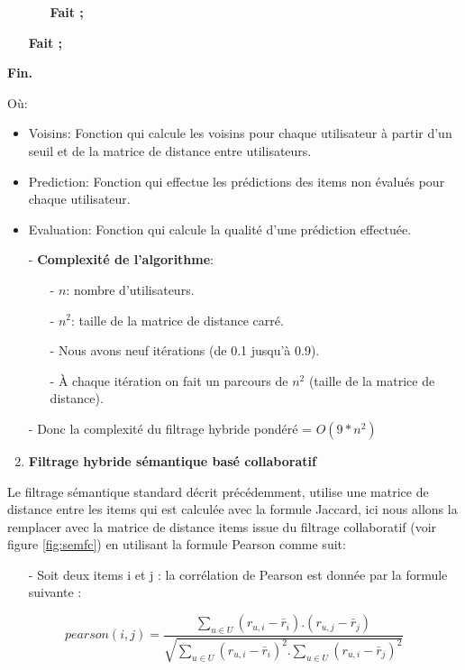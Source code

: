 \begin{algorithm}[H]
\begin{itemize}
\begin{itemize}
		\item [] \textbf{Fait ;} 
		\end{itemize}
		\item [] \textbf{Fait ;} 
	\end{itemize}
	\hspace*{\algorithmicindent}\textbf{ Fin.}
\end{algorithm} 

Où:
\begin{itemize}
	\item Voisins: Fonction qui calcule les voisins pour chaque utilisateur à partir d'un seuil et de la matrice de distance entre utilisateurs.
	\item Prediction: Fonction qui effectue les prédictions des items non évalués pour chaque utilisateur.
	\item Evaluation: Fonction qui calcule la qualité d'une prédiction effectuée. 
\end{itemize}

\begin{itemize}
	\item [-] \textbf{Complexité de l'algorithme}:
	\begin{itemize}
		\item [-] $n$: nombre d'utilisateurs.
		\item [-] $n^2$: taille de la matrice de distance carré.
		\item [-] Nous avons neuf itérations (de 0.1 jusqu'à 0.9).
		\item [-] À chaque itération on fait un parcours de $n^2$ (taille de la matrice de distance).
	\end{itemize}
	\item [-]  Donc la complexité du filtrage hybride pondéré = $O(9*n^2)$
\end{itemize}


\begin{enumerate}[nosep,label=\textbf{\arabic*)}]
	 \setcounter{enumi}{1}
	\item \textbf{Filtrage hybride sémantique basé collaboratif}
\end{enumerate}\mbox{}\indent Le filtrage sémantique standard décrit précédemment, utilise une matrice de distance entre les items qui est calculée avec la formule Jaccard, ici nous allons la remplacer avec la matrice de distance items issue du filtrage collaboratif (voir figure \ref{fig:semfc}) en utilisant la formule Pearson comme suit:
\begin{itemize}
	\item [-]Soit deux items i et j : la corrélation de Pearson est donnée par la formule suivante :
\end{itemize}
\begin{equation}
pearson(i,j)=\frac{\sum_{u \in U} (r_{u,i}-\bar{r}_{i}).(r_{u,j}-\bar{r}_{j})}{\sqrt{\sum_{u \in U} (r_{u,i}-\bar{r}_{i})^{2}.\sum_{u \in U}(r_{u,i}-\bar{r}_{j})^{2}}}
\end{equation}

